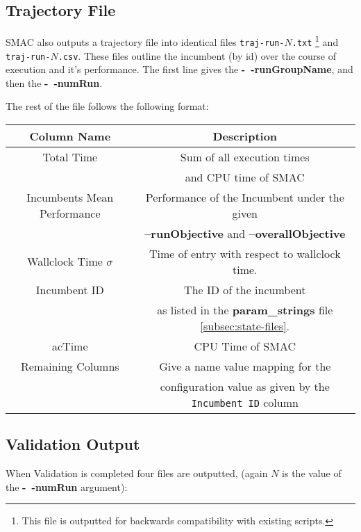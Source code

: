 \documentclass[manual.tex]{subfiles}
\begin{document}
\subsection{Trajectory File}

SMAC also outputs a trajectory file into identical files \texttt{traj-run-$N$.txt} \footnote{This file is outputted for backwards compatibility with existing scripts.} and \texttt{traj-run-$N$.csv}. These files outline the incumbent (by id) over the course of execution and it's performance. The first line gives the 
\textbf{-~$\!\!$-runGroupName}, and then the  \textbf{-~$\!\!$-numRun}.

The rest of the file follows the following format:

\begin{tabular}{|c|c|}
\hline 
Column Name & Description\tabularnewline
\hline 
\hline 
Total Time & Sum of all execution times \\ & and CPU time of SMAC\tabularnewline
\hline 
Incumbents Mean Performance & Performance of the Incumbent under the given \\ &  \textbf{--runObjective
}and \textbf{--overallObjective}\tabularnewline
\hline 
Wallclock Time $\sigma$ & Time of entry with respect to wallclock time. %
\tabularnewline
\hline 
Incumbent ID & The ID of the incumbent \\ & as listed in the \textbf{param\_strings} file \ref{subsec:state-files}.
\tabularnewline
\hline 
acTime & CPU Time of SMAC\tabularnewline
\hline 
Remaining Columns & Give a name value mapping for the \\& configuration value as given by the \texttt{Incumbent ID} column \tabularnewline
\hline 
\end{tabular}

\subsection{Validation Output}

When Validation is completed four files are outputted, (again $N$ is the value of the \textbf{-~$\!\!$-numRun} argument):
\end{document}
